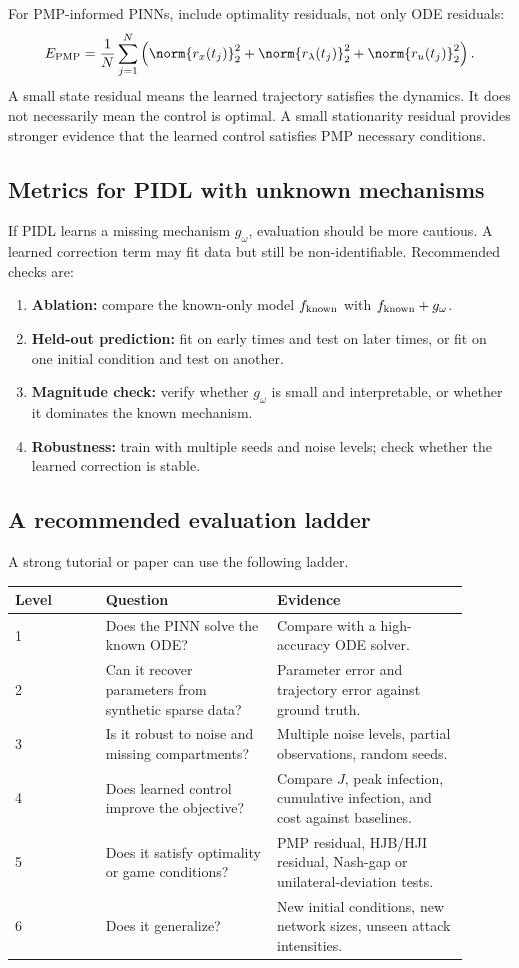 \documentclass[11pt,a4paper]{article}
\begin{document}
For PMP-informed PINNs, include optimality residuals, not only ODE residuals:
\begin{equation}
    E_{\rm PMP}=\frac{1}{N}\sum_{j=1}^N\left(\norm{r_x(t_j)}_2^2+\norm{r_\lambda(t_j)}_2^2+\norm{r_u(t_j)}_2^2\right).
\end{equation}
A small state residual means the learned trajectory satisfies the dynamics. It does not necessarily mean the control is optimal. A small stationarity residual provides stronger evidence that the learned control satisfies PMP necessary conditions.

\subsection{Metrics for PIDL with unknown mechanisms}
If PIDL learns a missing mechanism $g_\omega$, evaluation should be more cautious. A learned correction term may fit data but still be non-identifiable. Recommended checks are:
\begin{enumerate}[leftmargin=2em]
    \item \textbf{Ablation:} compare the known-only model $f_{\rm known}$ with $f_{\rm known}+g_\omega$.
    \item \textbf{Held-out prediction:} fit on early times and test on later times, or fit on one initial condition and test on another.
    \item \textbf{Magnitude check:} verify whether $g_\omega$ is small and interpretable, or whether it dominates the known mechanism.
    \item \textbf{Robustness:} train with multiple seeds and noise levels; check whether the learned correction is stable.
\end{enumerate}

\subsection{A recommended evaluation ladder}
A strong tutorial or paper can use the following ladder.
\begin{longtable}{p{0.18\linewidth}p{0.34\linewidth}p{0.38\linewidth}}
\toprule
Level & Question & Evidence \\
\midrule
1 & Does the PINN solve the known ODE? & Compare with a high-accuracy ODE solver. \\
2 & Can it recover parameters from synthetic sparse data? & Parameter error and trajectory error against ground truth. \\
3 & Is it robust to noise and missing compartments? & Multiple noise levels, partial observations, random seeds. \\
4 & Does learned control improve the objective? & Compare $J$, peak infection, cumulative infection, and cost against baselines. \\
5 & Does it satisfy optimality or game conditions? & PMP residual, HJB/HJI residual, Nash-gap or unilateral-deviation tests. \\
6 & Does it generalize? & New initial conditions, new network sizes, unseen attack intensities. \\
\bottomrule
\end{longtable}
\end{document}
